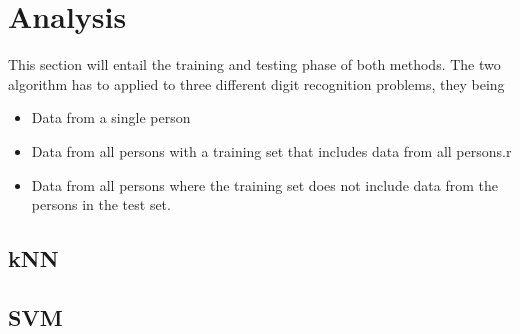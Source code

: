 \section{Analysis}
This section will entail the training and testing phase of both methods. The two 
algorithm has to applied to three different digit recognition problems, they 
being 
\begin{itemize}
\item	Data from a single person
\item	Data from all persons with a training set that includes data from all 
persons.r
\item Data from all persons where the training set does not include data from 
the persons in the test set.
\end{itemize}

\subsection{kNN}

\subsection{SVM}
